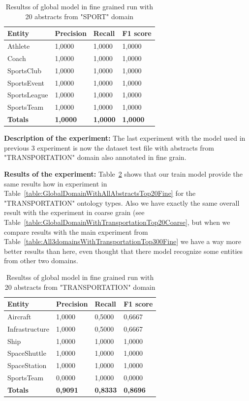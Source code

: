 \documentclass[thesis=M,english]{FITthesis}[2018/05/30]
\begin{document}
	\begin{table}[H]\centering
		\begin{tabular}{|l|l|l|l|}
			\hline {\textbf{Entity}} & {\textbf{Precision}} & {\textbf{Recall}} & {\textbf{F1 score}}\\\hline
				Athlete & 1,0000 & 1,0000 & 1,0000\\
				Coach & 1,0000 & 1,0000 & 1,0000\\
				SportsClub & 1,0000 & 1,0000 & 1,0000\\
				SportsEvent & 1,0000 & 1,0000 & 1,0000\\
				SportsLeague & 1,0000 & 1,0000 & 1,0000\\
				SportsTeam & 1,0000 & 1,0000 & 1,0000\\\hline
				\textbf{Totals} & \textbf{1,0000} & \textbf{1,0000} & \textbf{1,0000}\\\hline
		\end{tabular}
		\caption{Resultss of global model in fine grained run with 20 abstracts from "SPORT" domain \label{table:GlobalDomainWithSportTop20Fine}}
	\end{table}	

\textbf{Description of the experiment:} The last experiment with the model used in previous 3 experiment is now the dataset test file with abstracts from "TRANSPORTATION" domain also annotated in fine grain.

\textbf{Results of the experiment:} Table~\ref{table:GlobalDomainWithTransportationTop20Fine} shows that our train model provide the same results how in experiment in Table~\ref{table:GlobalDomainWithAllAbstractsTop20Fine} for the "TRANSPORTATION" ontology types. Also we have exactly the same overall result with the experiment in coarse grain (see Table~\ref{table:GlobalDomainWithTransportationTop20Coarse}, but when we compare results with the main experiment from Table~\ref{table:All3domainsWithTransportationTop300Fine} we have a way more better results than here, even thought that there model recognize some entities from other two domains.

	\begin{table}[H]\centering
		\begin{tabular}{|l|l|l|l|}
			\hline {\textbf{Entity}} & {\textbf{Precision}} & {\textbf{Recall}} & {\textbf{F1 score}}\\\hline
				Aircraft & 1,0000 & 0,5000 & 0,6667\\
				Infrastructure & 1,0000 & 0,5000 & 0,6667\\
				Ship & 1,0000 & 1,0000 & 1,0000\\				
				SpaceShuttle & 1,0000 & 1,0000 & 1,0000\\
				SpaceStation & 1,0000 & 1,0000 & 1,0000\\
				SportsTeam & 0,0000 & 1,0000 & 0,0000\\\hline
				\textbf{Totals} & \textbf{0,9091} & \textbf{0,8333} & \textbf{0,8696}\\\hline
		\end{tabular}
		\caption{Resultss of global model in fine grained run with 20 abstracts from "TRANSPORTATION" domain \label{table:GlobalDomainWithTransportationTop20Fine}}		
	\end{table}
\end{document}
